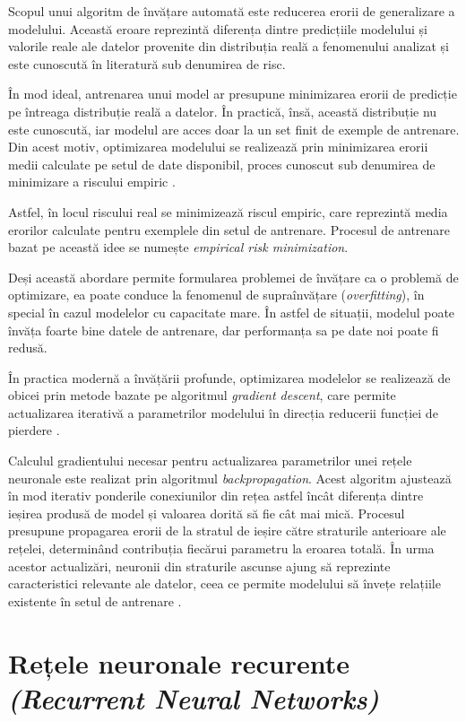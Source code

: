 \documentclass[12pt, a4paper, oneside, romanian]{teza-upb}
\begin{document}
Scopul unui algoritm de învățare automată este reducerea erorii de generalizare
a modelului. Această eroare reprezintă diferența dintre predicțiile modelului și
valorile reale ale datelor provenite din distribuția reală a fenomenului analizat
și este cunoscută în literatură sub denumirea de risc.

În mod ideal, antrenarea unui model ar presupune minimizarea erorii de predicție pe întreaga distribuție reală a datelor. În practică, însă, această distribuție nu este cunoscută, iar modelul are acces doar la un set finit de exemple de antrenare. Din acest motiv, optimizarea modelului se realizează prin minimizarea erorii medii calculate pe setul de date disponibil, proces cunoscut sub denumirea de minimizare a riscului empiric \cite{goodfellow2016}.

Astfel, în locul riscului real se minimizează riscul empiric, care reprezintă
media erorilor calculate pentru exemplele din setul de antrenare. Procesul de
antrenare bazat pe această idee se numește \textit{empirical
risk minimization}.

Deși această abordare permite formularea problemei de învățare ca o problemă
de optimizare, ea poate conduce la fenomenul de supraînvățare
(\textit{overfitting}), în special în cazul modelelor cu capacitate mare.
În astfel de situații, modelul poate învăța foarte bine datele de antrenare,
dar performanța sa pe date noi poate fi redusă.

În practica modernă a învățării profunde, optimizarea modelelor se realizează
de obicei prin metode bazate pe algoritmul \textit{gradient descent}, care
permite actualizarea iterativă a parametrilor modelului în direcția reducerii
funcției de pierdere \cite{goodfellow2016}.

Calculul gradientului necesar pentru actualizarea parametrilor unei rețele
neuronale este realizat prin algoritmul \textit{backpropagation}. Acest algoritm
ajustează în mod iterativ ponderile conexiunilor din rețea astfel încât
diferența dintre ieșirea produsă de model și valoarea dorită să fie cât mai mică.
Procesul presupune propagarea erorii de la stratul de ieșire către straturile
anterioare ale rețelei, determinând contribuția fiecărui parametru la eroarea
totală. În urma acestor actualizări, neuronii din straturile ascunse ajung să
reprezinte caracteristici relevante ale datelor, ceea ce permite modelului să
învețe relațiile existente în setul de antrenare \cite{rumelhart1986learning}.


\section{Rețele neuronale recurente \textit{(Recurrent Neural Networks)}}
\end{document}
